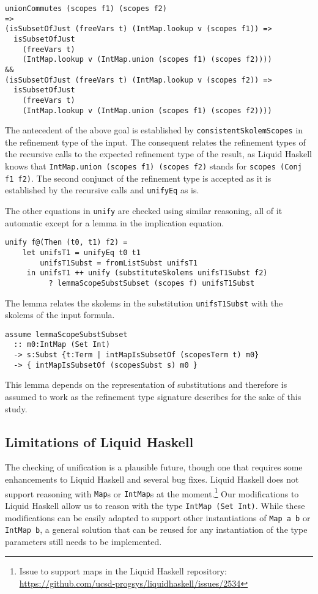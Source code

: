 \documentclass[sigconf, anonymous, review]{acmart}
\newcommand{\tc}[1]{{\small\texttt{#1}}}
\begin{document}
\begin{verbatim}
unionCommutes (scopes f1) (scopes f2)
=>
(isSubsetOfJust (freeVars t) (IntMap.lookup v (scopes f1)) =>
  isSubsetOfJust
    (freeVars t)
    (IntMap.lookup v (IntMap.union (scopes f1) (scopes f2))))
&&
(isSubsetOfJust (freeVars t) (IntMap.lookup v (scopes f2)) =>
  isSubsetOfJust
    (freeVars t)
    (IntMap.lookup v (IntMap.union (scopes f1) (scopes f2))))
\end{verbatim}

The antecedent of the above goal is established by \tc{consistent\-Skolem\-Scopes}
in the refinement type of the input. The consequent relates the refinement types
of the recursive calls to the expected refinement type of the result, as Liquid
Haskell knows that \tc{IntMap.\allowbreak union (scopes f1) (scopes f2)} stands for
\tc{scopes (Conj f1 f2)}. The second conjunct of the refinement type
is accepted as it is established by the recursive calls and \tc{unifyEq}
as is.

The other equations in \tc{unify} are checked using similar reasoning, all of it
automatic except for a lemma in the implication equation.

\begin{verbatim}
unify f@(Then (t0, t1) f2) =
    let unifsT1 = unifyEq t0 t1
        unifsT1Subst = fromListSubst unifsT1
     in unifsT1 ++ unify (substituteSkolems unifsT1Subst f2)
          ? lemmaScopeSubstSubset (scopes f) unifsT1Subst
\end{verbatim}

The lemma relates the skolems in the substitution \tc{unifsT1Subst}
with the skolems of the input formula.

\begin{verbatim}
assume lemmaScopeSubstSubset
  :: m0:IntMap (Set Int)
  -> s:Subst {t:Term | intMapIsSubsetOf (scopesTerm t) m0}
  -> { intMapIsSubsetOf (scopesSubst s) m0 }
\end{verbatim}

This lemma depends on the representation of substitutions and therefore is
assumed to work as the refinement type signature describes for the sake of
this study.


\subsection{Limitations of Liquid Haskell}
\label{limitations-of-liquid-haskell}

The checking of unification is a plausible future, though one that requires
some enhancements to Liquid Haskell and several bug fixes. Liquid Haskell does
not support reasoning with \tc{Map}s or \tc{IntMap}s at the
moment.\footnote{Issue to support maps in the Liquid Haskell repository: \url{https://github.com/ucsd-progsys/liquidhaskell/issues/2534}} Our
modifications to Liquid Haskell allow us to reason with the type
\tc{IntMap (Set Int)}. While these modifications can be easily adapted to
support other instantiations of \tc{Map a b} or \tc{IntMap b}, a general
solution that can be reused for any instantiation of the type parameters still
needs to be implemented.
\end{document}
